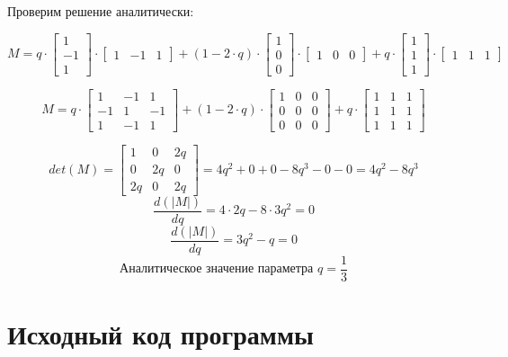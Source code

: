 Проверим решение аналитически:

\[
	M = q \cdot
	\begin{bmatrix}
		 1		\\
		-1		\\
		 1
	\end{bmatrix}
	\cdot
	\begin{bmatrix}
	    1 & -1 & 1
	\end{bmatrix}
	+ (1 - 2\cdot q) \cdot
	\begin{bmatrix}
		1		\\
		0		\\
		0
	\end{bmatrix}
	\cdot
	\begin{bmatrix}
	    1 & 0 & 0
	\end{bmatrix}
	+ q \cdot
	\begin{bmatrix}
		1		\\
		1		\\
		1
	\end{bmatrix}
	\cdot
	\begin{bmatrix}
	    1 & 1 & 1
	\end{bmatrix}
\]


\[
	M = q \cdot
	\begin{bmatrix}
		 1		&	 -1		&		1	\\
		-1		&	  1		&     -1	\\
		 1		&	 -1		&		1
	\end{bmatrix}
	+ (1 - 2\cdot q) \cdot
	\begin{bmatrix}
		 1		&	  0		&		0	\\
		 0		&	  0		&      0	\\
		 0		&	  0		&		0
	\end{bmatrix}
	+ q \cdot
	\begin{bmatrix}
		 1		&	  1		&		1	\\
		 1		&	  1		&      1	\\
		 1		&	  1		&		1
	\end{bmatrix}
\]

\[
	det(M) =
	\begin{bmatrix}
		 1		&	  0		&	   2q	\\
		 0		&	 2q		&		0	\\
		2q		&	  0		&	   2q
	\end{bmatrix}
	= 4q^2 + 0 + 0 - 8q^3 - 0 - 0
	= 4q^2 - 8q^3
\]
\[ \frac{d(|M|)}{dq} = 4 \cdot 2 q - 8 \cdot 3 q^2 = 0 \]
\[ \frac{d(|M|)}{dq} = 3 q^2 - q = 0 \]
\[ \text{Аналитическое значение параметра } q = \frac{1}{3} \]


\section{Исходный код программы}
